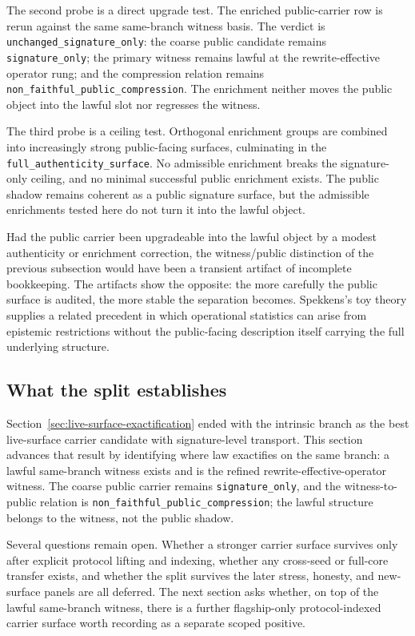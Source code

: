 \documentclass[11pt]{article}
\theoremstyle{definition}
\begin{document}
The second probe is a direct upgrade test. The enriched public-carrier row is rerun
against the same same-branch witness basis. The verdict is
\texttt{unchanged\_signature\_only}: the coarse public candidate remains
\texttt{signature\_only}; the primary witness remains lawful at the rewrite-effective
operator rung; and the compression relation remains
\texttt{non\_faithful\_public\_compression}. The enrichment neither moves the public
object into the lawful slot nor regresses the witness.

The third probe is a ceiling test. Orthogonal enrichment groups are combined into
increasingly strong public-facing surfaces, culminating in the
\texttt{full\_authenticity\_surface}. No admissible enrichment breaks the signature-only
ceiling, and no minimal successful public enrichment exists. The public shadow remains
coherent as a public signature surface, but the admissible enrichments tested here do
not turn it into the lawful object.

Had the public carrier been upgradeable into the lawful object by a modest authenticity
or enrichment correction, the witness/public distinction of the previous subsection
would have been a transient artifact of incomplete bookkeeping. The artifacts show the
opposite: the more carefully the public surface is audited, the more stable the
separation becomes. Spekkens's toy theory \citep{Spekkens2007} supplies a related
precedent in which operational statistics can arise from epistemic restrictions
without the public-facing description itself carrying the full underlying structure.

\subsection{What the split establishes}

Section~\ref{sec:live-surface-exactification} ended with the intrinsic branch as the
best live-surface carrier candidate with signature-level transport. This section
advances that result by identifying where law exactifies on the same branch: a lawful
same-branch witness exists and is the refined rewrite-effective-operator witness. The
coarse public carrier remains \texttt{signature\_only}, and the witness-to-public
relation is \texttt{non\_faithful\_public\_compression}; the lawful structure belongs
to the witness, not the public shadow.

Several questions remain open. Whether a stronger carrier surface survives only after
explicit protocol lifting and indexing, whether any cross-seed or full-core transfer
exists, and whether the split survives the later stress, honesty, and new-surface
panels are all deferred. The next section asks whether, on top of the lawful
same-branch witness, there is a further flagship-only protocol-indexed carrier surface
worth recording as a separate scoped positive.
\end{document}
